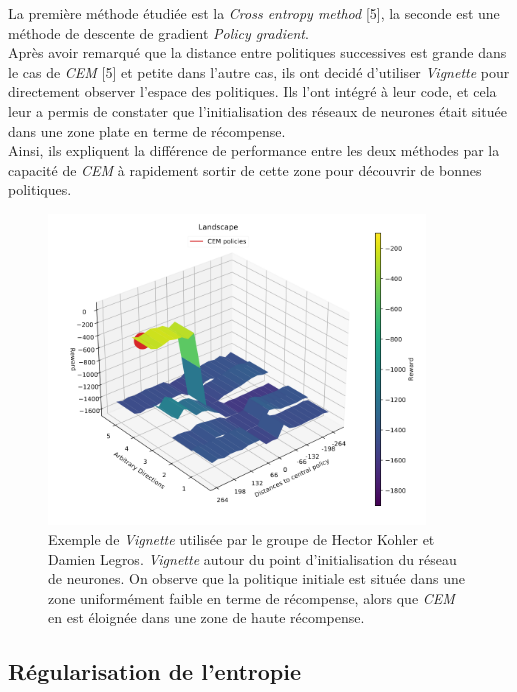 \documentclass[12pt]{article}
\begin{document}
La première méthode étudiée est la \emph{Cross entropy method} [5], la seconde est une méthode de descente de gradient \emph{Policy gradient}. \\

Après avoir remarqué que la distance entre politiques successives est grande dans le cas de \emph{CEM} [5] et petite dans l'autre cas, ils ont decidé d'utiliser \emph{Vignette} pour directement observer l'espace des politiques. Ils l'ont intégré à leur code, et cela leur a permis de constater que l'initialisation des réseaux de neurones était située dans une zone plate en terme de récompense. \\

Ainsi, ils expliquent la différence de performance entre les deux méthodes par la capacité de \emph{CEM} à rapidement sortir de cette zone pour découvrir de bonnes politiques. \\

\begin{figure}[htp]
    \centering
    \includegraphics[width=10cm]{Images/cem_example}
    \caption{Exemple de \emph{Vignette} utilisée par le groupe de Hector Kohler et Damien Legros. \emph{Vignette} autour du point d'initialisation du réseau de neurones. On observe que la politique initiale est située dans une zone uniformément faible en terme de récompense, alors que \emph{CEM} en est éloignée dans une zone de haute récompense.}
    \label{fig:cemExample}
\end{figure}

\subsection{Régularisation de l'entropie}
\end{document}
